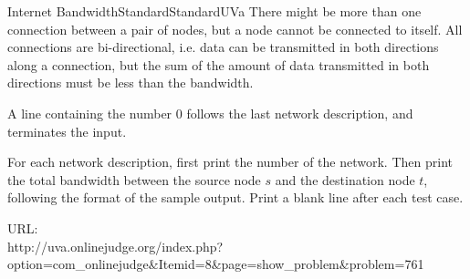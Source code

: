 \begin{problema}{Internet Bandwidth}{Standard}{Standard}{UVa}
There might be more than one connection between a pair of nodes, but a node cannot be connected to itself. All connections are bi-directional, i.e. data can be transmitted in both directions along a connection, but the sum of the amount of data transmitted in both directions must be less than the bandwidth. 

A line containing the number $0$ follows the last network description, and terminates the input. 
 \\


\OutputFile

For each network description, first print the number of the network. Then print the total bandwidth between the source node $s$ and the destination node $t$, following the format of the sample output. Print a blank line after each test case.  \\


\Example




URL: \\
http://uva.onlinejudge.org/index.php?
\\option=com\_onlinejudge\&Itemid=8\&page=show\_problem\&problem=761

\end{problema}

